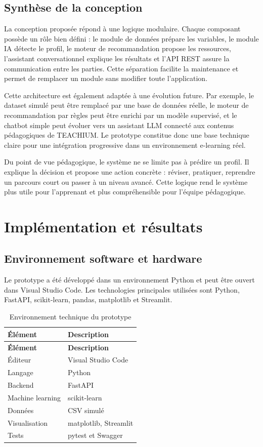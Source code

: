\documentclass[12pt,a4paper]{report}
\begin{document}
\section{Synthèse de la conception}

La conception proposée répond à une logique modulaire. Chaque composant possède un rôle bien défini : le module de données prépare les variables, le module IA détecte le profil, le moteur de recommandation propose les ressources, l'assistant conversationnel explique les résultats et l'API REST assure la communication entre les parties. Cette séparation facilite la maintenance et permet de remplacer un module sans modifier toute l'application.

Cette architecture est également adaptée à une évolution future. Par exemple, le dataset simulé peut être remplacé par une base de données réelle, le moteur de recommandation par règles peut être enrichi par un modèle supervisé, et le chatbot simple peut évoluer vers un assistant LLM connecté aux contenus pédagogiques de TEACHIUM. Le prototype constitue donc une base technique claire pour une intégration progressive dans un environnement e-learning réel.

Du point de vue pédagogique, le système ne se limite pas à prédire un profil. Il explique la décision et propose une action concrète : réviser, pratiquer, reprendre un parcours court ou passer à un niveau avancé. Cette logique rend le système plus utile pour l'apprenant et plus compréhensible pour l'équipe pédagogique.

\chapter{Implémentation et résultats}

\section{Environnement software et hardware}

Le prototype a été développé dans un environnement Python et peut être ouvert dans Visual Studio Code. Les technologies principales utilisées sont Python, FastAPI, scikit-learn, pandas, matplotlib et Streamlit.

\begin{longtable}{|p{4cm}|p{10cm}|}
\caption{Environnement technique du prototype}\\
\hline
\textbf{Élément} & \textbf{Description} \\
\hline
\endfirsthead
\hline
\textbf{Élément} & \textbf{Description} \\
\hline
\endhead
Éditeur & Visual Studio Code \\
\hline
Langage & Python \\
\hline
Backend & FastAPI \\
\hline
Machine learning & scikit-learn \\
\hline
Données & CSV simulé \\
\hline
Visualisation & matplotlib, Streamlit \\
\hline
Tests & pytest et Swagger \\
\hline
\end{longtable}
\end{document}

